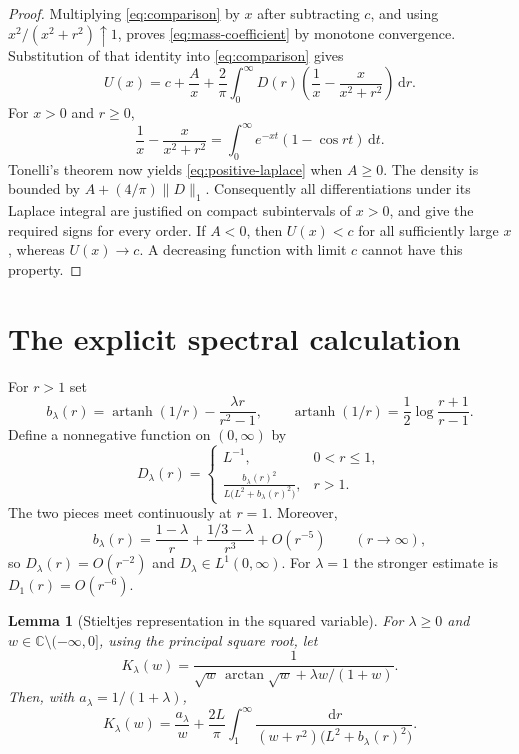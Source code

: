 \documentclass[11pt,a4paper]{article}
\newtheorem{lemma}[theorem]{Lemma}
\theoremstyle{definition}\newtheorem{definition}[theorem]{Definition}
\theoremstyle{remark}\newtheorem{remark}[theorem]{Remark}
\newcommand{\dd}{\,\mathrm d}
\DeclareMathOperator{\artanh}{artanh}
\begin{document}
\begin{proof}
Multiplying \eqref{eq:comparison} by $x$ after subtracting $c$,
and using $x^2/(x^2+r^2)\uparrow1$, proves
\eqref{eq:mass-coefficient} by monotone convergence. Substitution
of that identity into \eqref{eq:comparison} gives
\[
 U(x)=c+\frac A x+\frac2\pi\int_0^\infty D(r)
                  \left(\frac1x-\frac{x}{x^2+r^2}\right)\dd r.
\]
For $x>0$ and $r\ge0$,
\begin{equation}\label{eq:cosine-identity}
 \frac1x-\frac{x}{x^2+r^2}
 =\int_0^\infty e^{-xt}(1-\cos rt)\dd t.
\end{equation}
Tonelli's theorem now yields \eqref{eq:positive-laplace} when
$A\ge0$. The density is bounded by
$A+(4/\pi)\|D\|_1$. Consequently all differentiations under its
Laplace integral are justified on compact subintervals of $x>0$,
and give the required signs for every order. If $A<0$, then
$U(x)<c$ for all sufficiently large $x$, whereas $U(x)\to c$.
A decreasing function with limit $c$ cannot have this property.
\end{proof}

\section{The explicit spectral calculation}

For $r>1$ set
\begin{equation}\label{eq:b}
 b_\lambda(r)=\artanh(1/r)-\frac{\lambda r}{r^2-1},
 \qquad
 \artanh(1/r)=\frac12\log\frac{r+1}{r-1}.
\end{equation}
Define a nonnegative function on $(0,\infty)$ by
\begin{equation}\label{eq:D}
 D_\lambda(r)=
 \begin{cases}
 L^{-1},&0<r\le1,\\[2pt]
 \displaystyle\frac{b_\lambda(r)^2}
 {L\bigl(L^2+b_\lambda(r)^2\bigr)},&r>1.
 \end{cases}
\end{equation}
The two pieces meet continuously at $r=1$. Moreover,
\[
 b_\lambda(r)=\frac{1-\lambda}{r}
       +\frac{1/3-\lambda}{r^3}+O(r^{-5})
       \qquad(r\to\infty),
\]
so $D_\lambda(r)=O(r^{-2})$ and $D_\lambda\in L^1(0,\infty)$.
For $\lambda=1$ the stronger estimate is $D_1(r)=O(r^{-6})$.

\begin{lemma}[Stieltjes representation in the squared variable]
\label{lem:K}
For $\lambda\ge0$ and $w\in\mathbb C\setminus(-\infty,0]$, using
the principal square root, let
\[
 K_\lambda(w)=
 \frac1{\sqrt w\,\arctan\sqrt w+\lambda w/(1+w)}.
\]
Then, with $a_\lambda=1/(1+\lambda)$,
\begin{equation}\label{eq:K-representation}
 K_\lambda(w)=\frac{a_\lambda}{w}
 +\frac{2L}{\pi}\int_1^\infty
    \frac{\dd r}{(w+r^2)\bigl(L^2+b_\lambda(r)^2\bigr)}.
\end{equation}
\end{lemma}
\end{document}
